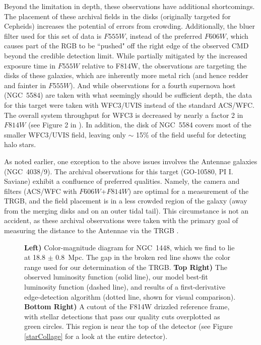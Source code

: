 \documentclass[twocolumn]{aastex62}
\begin{document}
Beyond the limitation in depth, these observations have additional shortcomings. The placement of these archival fields in the disks (originally targeted for Cepheids) increases the potential of errors from crowding. Additionally, the bluer filter used for this set of data is $F555W$, instead of the preferred $F606W$, which causes part of the RGB to be ``pushed" off the right edge of the observed CMD beyond the credible detection limit. While partially mitigated by the increased exposure time in $F555W$ relative to F814W, the observations are targeting the disks of these galaxies, which are inherently more metal rich (and hence redder and fainter in $F555W$). And while observations for a fourth supernova host (NGC~5584) are taken with what seemingly should be sufficient depth, the data for this target were taken with WFC3/UVIS instead of the standard ACS/WFC. The overall system throughput for WFC3 is decreased by nearly a factor 2 in $F814W$ (see Figure 2 in \citealt{2018wfc..rept....2D}). In addition, the disk of NGC~5584 covers most of the smaller WFC3/UVIS field, leaving only $\sim$ 15\% of the field useful for detecting halo stars.


As noted earlier, one exception to the above issues involves the Antennae galaxies (NGC~4038/9). The archival observations for this target (GO-10580, PI I. Saviane) exhibit a confluence of preferred qualities. Namely, the camera and filters (ACS/WFC with $F606W$+$F814W$) are optimal for a measurement of the TRGB, and the field placement is in a less crowded region of the galaxy (away from the merging disks and on an outer tidal tail). This circumstance is not an accident, as these archival observations were taken with the primary goal of measuring the distance to the Antennae via the TRGB \citep{2008ApJ...678..179S, 2008AJ....136.1482S}. 

\begin{figure*}
\caption{\textbf{Left)} Color-magnitude diagram for NGC~1448, which we find to lie at 18.8 $\pm$ 0.8~Mpc. The gap in the broken red line shows the color range used for our determination of the TRGB. \textbf{Top Right)} The observed luminosity function (solid line), our model best-fit luminosity function (dashed line), and results of a first-derivative edge-detection algorithm (dotted line, shown for visual comparison). \textbf{Bottom Right)} A cutout of the F814W drizzled reference frame, with stellar detections that pass our quality cuts overplotted as green circles. This region is near the top of the detector (see Figure \ref{starCollage} for a look at the entire detector).}
\label{NGC1448}
\end{figure*}
\end{document}
